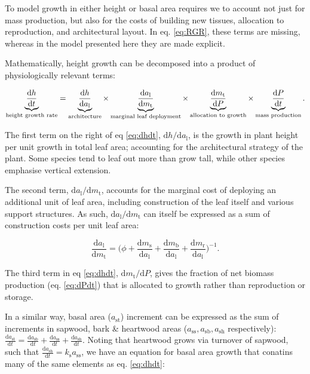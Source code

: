 \documentclass[12pt, a4paper]{article}
\begin{document}
To model growth in either height or basal area requires we to account
not just for mass production, but also for the costs of building new
tissues, allocation to reproduction, and architectural layout. In eq.
\ref{eq:RGR}, these terms are missing, whereas in the model presented
here they are made explicit.

Mathematically, height growth can be decomposed into a product of
physiologically relevant terms\citep{falster-2011}:

\begin{equation} \label{eq:dhdt}
\underbrace{\strut\frac{\textrm{d}h}{\textrm{d}t}}_\textrm{height growth rate}= \underbrace{\strut\frac{\textrm{d}h}{\textrm{d}a_\textrm{l}}}_\textrm{architecture}
\times \underbrace{\strut\frac{\textrm{d}a_\textrm{l}}{\textrm{d}m_\textrm{t}}}_\textrm{marginal leaf deployment}
\times \underbrace{\strut\frac{\textrm{d}m_\textrm{t}}{\textrm{d}P}}_\textrm{allocation to growth}
\times \underbrace{\strut\frac{\textrm{d}P}{\textrm{d}t}}_\textrm{mass production}.
\end{equation}

The first term on the right of eq \ref{eq:dhdt},
\(\textrm{d}h / \textrm{d}a_\textrm{l}\), is the growth in plant height
per unit growth in total leaf area; accounting for the architectural
strategy of the plant. Some species tend to leaf out more than grow
tall, while other species emphasise vertical
extension\citep{poorter-2006}.

The second term, \(\textrm{d}a_\textrm{l} / \textrm{d}m_\textrm{t}\),
accounts for the marginal cost of deploying an additional unit of leaf
area, including construction of the leaf itself and various support
structures. As such, \(\textrm{d}a_\textrm{l} / \textrm{d}m_\textrm{t}\)
can itself be expressed as a sum of construction costs per unit leaf
area:

\begin{equation}\label{eq:daldmt}
\frac{\textrm{d}a_\textrm{l}}{\textrm{d}m_\textrm{t}}
= \big(\phi
 + \frac{\textrm{d}m_\textrm{s}}{\textrm{d}a_\textrm{l}} + \frac{\textrm{d}m_\textrm{b}}{\textrm{d}a_\textrm{l}} + \frac{\textrm{d}m_\textrm{r}}{\textrm{d}a_\textrm{l}}\big)^{-1}.
\end{equation}

The third term in eq \ref{eq:dhdt},
\(\textrm{d}m_\textrm{t} / \textrm{d}P\), gives the fraction of net
biomass production (eq. \ref{eq:dPdt}) that is allocated to growth
rather than reproduction or storage.

In a similar way, basal area (\(a_\textrm{st}\)) increment can be
expressed as the sum of increments in sapwood, bark \& heartwood areas
(\(a_\textrm{ss}, a_\textrm{sb}, a_\textrm{sh}\) respectively):
\(\frac{\textrm{d}a_\textrm{st}}{\textrm{d}t}= \frac{\textrm{d}a_\textrm{sb}}{\textrm{d}t} + \frac{\textrm{d}a_\textrm{ss}}{\textrm{d}t} + \frac{\textrm{d}a_\textrm{sh}}{\textrm{d}t}\).
Noting that heartwood grows via turnover of sapwood, such that
\(\frac{\textrm{d}a_\textrm{sh}}{\textrm{d}t} = k_\textrm{s} a_\textrm{ss}\),
we have an equation for basal area growth that conatins many of the same
elements as eq. \ref{eq:dhdt}:
\end{document}
